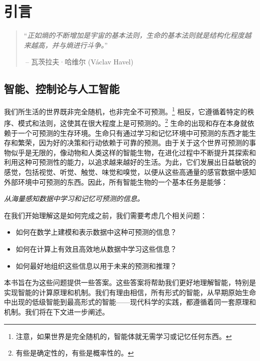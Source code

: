 \documentclass[../../book-main.tex]{subfiles}
\begin{document}
\chapter{引言}
\label{ch:intro}

\begin{quote}
“{\em 正如熵的不断增加是宇宙的基本法则，生命的基本法则就是结构化程度越来越高，并与熵进行斗争。}”

$~$\hfill -- 瓦茨拉夫·哈维尔 (V\'{a}clav Havel)
 \end{quote}
\vspace{5mm}



\section{智能、控制论与人工智能}
我们所生活的世界既非完全随机，也非完全不可预测。\footnote{注意，如果世界是完全随机的，智能体就无需学习或记忆任何东西。} 相反，它遵循着特定的秩序、模式和法则，这使其在很大程度上是可预测的。\footnote{有些是确定性的，有些是概率性的。} 生命的出现和存在本身就依赖于一个可预测的生存环境。生命只有通过学习和记忆环境中可预测的东西才能生存和繁荣，因为好的决策和行动依赖于可靠的预测。由于关于这个世界可预测的事物似乎是无限的，像动物和人类这样的智能生物，在进化过程中不断提升其探索和利用这种可预测性的能力，以追求越来越好的生活。为此，它们发展出日益敏锐的感觉，包括视觉、听觉、触觉、味觉和嗅觉，以便从这些高通量的感官数据中感知外部环境中可预测的东西。因此，所有智能生物的一个基本任务是能够：
\begin{center}
    {\em 从海量感知数据中学习和记忆可预测的信息。}
\end{center}
在我们开始理解这是如何完成之前，我们需要考虑几个相关问题：
\begin{itemize}
    \item 如何在数学上建模和表示数据中这种可预测的信息？
    \item 如何在计算上有效且高效地从数据中学习这些信息？
    \item 如何最好地组织这些信息以用于未来的预测和推理？
\end{itemize}
本书旨在为这些问题提供一些答案。这些答案将帮助我们更好地理解智能，特别是实现智能的计算原理和机制。我们有理由相信，所有形式的智能，从早期原始生命中出现的低级智能到最高形式的智能——现代科学的实践，都遵循着同一套原理和机制。我们将在下文进一步阐述。
\end{document}
